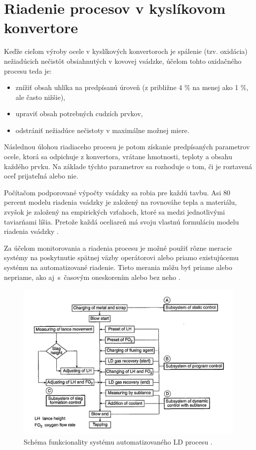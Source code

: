 \documentclass[]{tukediphc}
\begin{document}
\section{Riadenie procesov v kyslíkovom konvertore}

Keďže cieľom výroby ocele v kyslíkových konvertoroch je spálenie (tzv. oxidácia) nežiadúcich nečistôt obsiahnutých v kovovej vsádzke, účelom tohto oxidačného procesu teda je:

\begin{itemize}
	\item znížiť obsah uhlíka na predpísanú úroveň (z približne 4 \% na menej ako 1 \%, ale často nižšie),
	\item upraviť obsah potrebných cudzích prvkov,
	\item odstrániť nežiadúce nečistoty v maximálne možnej miere.
\end{itemize}

Následnou úlohou riadiaceho procesu je potom získanie predpísaných parametrov ocele, ktorá sa odpichuje z konvertora, vrátane hmotnosti, teploty a obsahu každého prvku. Na základe týchto parametrov sa rozhoduje o tom, či je roztavená oceľ prijateľná alebo nie.

Počítačom podporované výpočty vsádzky sa robia pre každú tavbu. Asi 80 percent modelu riadenia vsádzky je založený na rovnováhe tepla a materiálu, zvyšok je založený na empirických vzťahoch, ktoré sa medzi jednotlivými taviarňami líšia. Pretože každá oceliareň má svoju vlastnú formuláciu modelu riadenia vsádzky \cite{Turkdogan1996}.

Za účelom monitorovania a riadenia procesu je možné použiť rôzne meracie systémy na poskytnutie spätnej väzby operátorovi alebo priamo existujúcemu systému na automatizované riadenie. Tieto merania môžu byť priame alebo nepriame, ako aj~s~časovým oneskorením alebo bez neho \cite{Widlund1998}.

\begin{figure}[h!]
	\centering
	\includegraphics[width=.95\textwidth,angle=0]{figures/schematic-bof.jpg}
	\caption{Schéma funkcionality systému automatizovaného LD procesu \citep{Turkdogan1996}.}
\end{figure}
\end{document}
